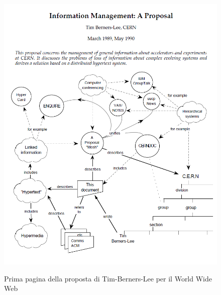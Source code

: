 \begin{figure}
\centering
     \includegraphics[width=1.0\textwidth]{images/proposta-web-1989.png}
    \caption{Prima pagina della proposta di Tim-Berners-Lee per il World Wide Web}
    \label{fig:proposta1989}
    \cite{propostaWWW1989}
    
\end{figure}

